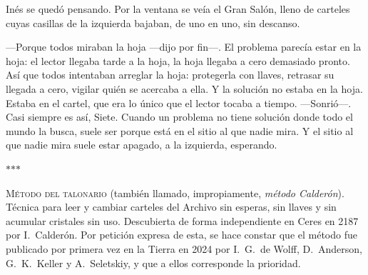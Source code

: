 Inés se quedó pensando. Por la ventana se veía el Gran Salón, lleno de carteles cuyas casillas de la izquierda bajaban, de uno en uno, sin descanso.

---Porque todos miraban la hoja ---dijo por fin---\nobreak. El problema parecía estar en la hoja: el lector llegaba tarde a la hoja, la hoja llegaba a cero demasiado pronto. Así que todos intentaban arreglar la hoja: protegerla con llaves, retrasar su llegada a cero, vigilar quién se acercaba a ella. Y la solución no estaba en la hoja. Estaba en el cartel, que era lo único que el lector tocaba a tiempo. ---Sonrió---\nobreak. Casi siempre es así, Siete. Cuando un problema no tiene solución donde todo el mundo la busca, suele ser porque está en el sitio al que nadie mira. Y el sitio al que nadie mira suele estar apagado, a la izquierda, esperando.

\bigskip
\begin{center}{\color{oxido}$\ast$\quad$\ast$\quad$\ast$}\end{center}
\bigskip

\begin{documento}
\textsc{Método del talonario} (también llamado, impropiamente, \emph{método Calderón}). Técnica para leer y cambiar carteles del Archivo sin esperas, sin llaves y sin acumular cristales sin uso. Descubierta de forma independiente en Ceres en 2187 por I.~Calderón. Por petición expresa de esta, se hace constar que el método fue publicado por primera vez en la Tierra en 2024 por I.~G.~de Wolff, D.~Anderson, G.~K.~Keller y A.~Seletskiy, y que a ellos corresponde la prioridad.
\end{documento}
